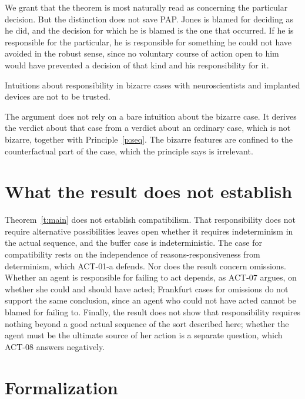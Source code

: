 \documentclass{situationist-preprint}
\begin{document}
\begin{reply}
We grant that the theorem is most naturally read as concerning the particular decision. But the distinction does not save PAP. Jones is blamed for deciding as he did, and the decision for which he is blamed is the one that occurred. If he is responsible for the particular, he is responsible for something he could not have avoided in the robust sense, since no voluntary course of action open to him would have prevented a decision of that kind and his responsibility for it.
\end{reply}

\begin{objection}
Intuitions about responsibility in bizarre cases with neuroscientists and implanted devices are not to be trusted.
\end{objection}

\begin{reply}
The argument does not rely on a bare intuition about the bizarre case. It derives the verdict about that case from a verdict about an ordinary case, which is not bizarre, together with Principle~\ref{p:seq}. The bizarre features are confined to the counterfactual part of the case, which the principle says is irrelevant.
\end{reply}

\section{What the result does not establish}

Theorem~\ref{t:main} does not establish compatibilism. That responsibility does not require alternative possibilities leaves open whether it requires indeterminism in the actual sequence, and the buffer case is indeterministic. The case for compatibility rests on the independence of reasons-responsiveness from determinism, which ACT-01-a defends. Nor does the result concern omissions. Whether an agent is responsible for failing to act depends, as ACT-07 argues, on whether she could and should have acted; Frankfurt cases for omissions do not support the same conclusion, since an agent who could not have acted cannot be blamed for failing to. Finally, the result does not show that responsibility requires nothing beyond a good actual sequence of the sort described here; whether the agent must be the ultimate source of her action is a separate question, which ACT-08 answers negatively.

\section{Formalization}
\end{document}
